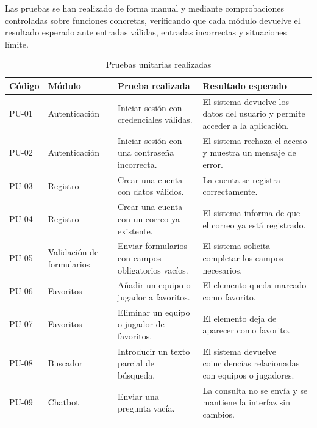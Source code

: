 Las pruebas se han realizado de forma manual y mediante comprobaciones controladas sobre funciones concretas, verificando que cada módulo devuelve el resultado esperado ante entradas válidas, entradas incorrectas y situaciones límite.

\begin{table}[H]
\centering
\caption{Pruebas unitarias realizadas}
\label{tab:pruebas_unitarias}
\renewcommand{\arraystretch}{1.2}
\begin{tabular}{|l|p{3cm}|p{5cm}|p{4cm}|}
\hline
\textbf{Código} & \textbf{Módulo} & \textbf{Prueba realizada} & \textbf{Resultado esperado} \\ \hline

PU-01 & Autenticación & Iniciar sesión con credenciales válidas. & El sistema devuelve los datos del usuario y permite acceder a la aplicación. \\ \hline

PU-02 & Autenticación & Iniciar sesión con una contraseña incorrecta. & El sistema rechaza el acceso y muestra un mensaje de error. \\ \hline

PU-03 & Registro & Crear una cuenta con datos válidos. & La cuenta se registra correctamente. \\ \hline

PU-04 & Registro & Crear una cuenta con un correo ya existente. & El sistema informa de que el correo ya está registrado. \\ \hline

PU-05 & Validación de formularios & Enviar formularios con campos obligatorios vacíos. & El sistema solicita completar los campos necesarios. \\ \hline

PU-06 & Favoritos & Añadir un equipo o jugador a favoritos. & El elemento queda marcado como favorito. \\ \hline

PU-07 & Favoritos & Eliminar un equipo o jugador de favoritos. & El elemento deja de aparecer como favorito. \\ \hline

PU-08 & Buscador & Introducir un texto parcial de búsqueda. & El sistema devuelve coincidencias relacionadas con equipos o jugadores. \\ \hline

PU-09 & Chatbot & Enviar una pregunta vacía. & La consulta no se envía y se mantiene la interfaz sin cambios. \\ \hline


\end{tabular}
\end{table}
